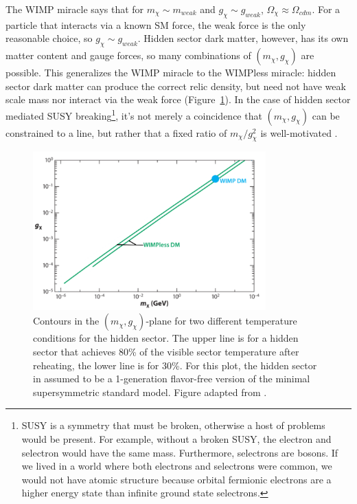 The \ac{WIMP} miracle says that for $m_{\chi} \sim m_{weak}$ and $g_{\chi} \sim g_{weak}$, $\Omega_{\chi} \approx \Omega_{cdm}$. For a particle that interacts via a known \ac{SM} force, the weak force is the only reasonable choice, so $g_{\chi} \sim g_{weak}$. Hidden sector dark matter, however, has its own matter content and gauge forces, so many combinations of $(m_{\chi}, g_{\chi})$ are possible. This generalizes the \ac{WIMP} miracle to the \ac{WIMP}less miracle: hidden sector dark matter can produce the correct relic density, but need not have weak scale mass nor interact via the weak force (Figure~\ref{fig:wimpless_miracle}).  
In the case of hidden sector mediated \ac{SUSY} breaking\footnote{\ac{SUSY} is a symmetry that must be broken, otherwise a host of problems would be present. For example, without a broken \ac{SUSY}, the electron and selectron would have the same mass. Furthermore, selectrons are bosons. If we lived in a world where both electrons and selectrons were common, we would not have atomic structure because orbital fermionic electrons are a higher energy state than infinite ground state selectrons.}, it's not merely a coincidence that $(m_{\chi}, g_{\chi})$ can be constrained to a line, but rather that a fixed ratio of $m_{\chi}/g_{\chi}^{2}$ is well-motivated \cite{Feng2008}.

\begin{figure}[htbp]
\begin{center}
\includegraphics[width=0.8\textwidth]{figures/theory/wimpless_miracle.png}
\caption{Contours in the $(m_{\chi}, g_{\chi})$-plane for two different temperature conditions for the hidden sector. The upper line is for a hidden sector that achieves 80\% of the visible sector temperature after reheating, the lower line is for 30\%. For this plot, the hidden sector in assumed to be a 1-generation flavor-free version of the minimal supersymmetric standard model. Figure adapted from \cite{Feng2010}. }
\label{fig:wimpless_miracle}
\end{center}
\end{figure}

